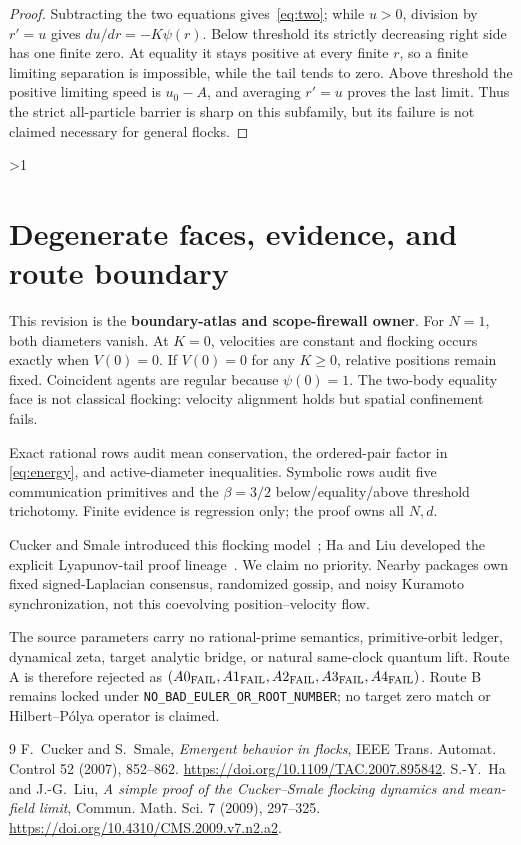 \documentclass[10pt]{article}
\providecommand{\CRevisionRound}{2}
\begin{document}
\begin{proof}
Subtracting the two equations gives~\eqref{eq:two}; while $u>0$, division by
$r'=u$ gives $du/dr=-K\psi(r)$.  Below threshold its strictly decreasing
right side has one finite zero.  At equality it stays positive at every finite
$r$, so a finite limiting separation is impossible, while the tail tends to
zero.  Above threshold the positive limiting speed is $u_0-A$, and averaging
$r'=u$ proves the last limit.  Thus the strict all-particle barrier is sharp on
this subfamily, but its failure is not claimed necessary for general flocks.
\end{proof}
\fi

\ifnum\CRevisionRound>1
\section{Degenerate faces, evidence, and route boundary}
This revision is the \textbf{boundary-atlas and scope-firewall owner}.
For $N=1$, both diameters vanish.  At $K=0$, velocities are constant and
flocking occurs exactly when $V(0)=0$.  If $V(0)=0$ for any $K\ge0$, relative
positions remain fixed.  Coincident agents are regular because $\psi(0)=1$.
The two-body equality face is not classical flocking: velocity alignment holds
but spatial confinement fails.

Exact rational rows audit mean conservation, the ordered-pair factor in
\eqref{eq:energy}, and active-diameter inequalities.  Symbolic rows audit five
communication primitives and the $\beta=3/2$ below/equality/above threshold
trichotomy.  Finite evidence is regression only; the proof owns all $N,d$.

Cucker and Smale introduced this flocking model~\cite{CS}; Ha and Liu developed
the explicit Lyapunov-tail proof lineage~\cite{HL}.  We claim no priority.
Nearby packages own fixed signed-Laplacian consensus, randomized gossip, and
noisy Kuramoto synchronization, not this coevolving position--velocity flow.

The source parameters carry no rational-prime semantics, primitive-orbit
ledger, dynamical zeta, target analytic bridge, or natural same-clock quantum
lift.  Route A is therefore rejected as
$(A0_{\rm FAIL},A1_{\rm FAIL},A2_{\rm FAIL},A3_{\rm FAIL},A4_{\rm FAIL})$.
Route B remains locked under \texttt{NO\_BAD\_EULER\_OR\_ROOT\_NUMBER}; no
target zero match or Hilbert--P\'olya operator is claimed.

\begin{thebibliography}{9}
\small
{} F.~Cucker and S.~Smale, \emph{Emergent behavior in flocks},
IEEE Trans. Automat. Control 52 (2007), 852--862.
\url{https://doi.org/10.1109/TAC.2007.895842}.
 S.-Y.~Ha and J.-G.~Liu, \emph{A simple proof of the Cucker--Smale
flocking dynamics and mean-field limit}, Commun. Math. Sci. 7 (2009), 297--325.
\url{https://doi.org/10.4310/CMS.2009.v7.n2.a2}.
\end{thebibliography}
\fi
\end{document}
